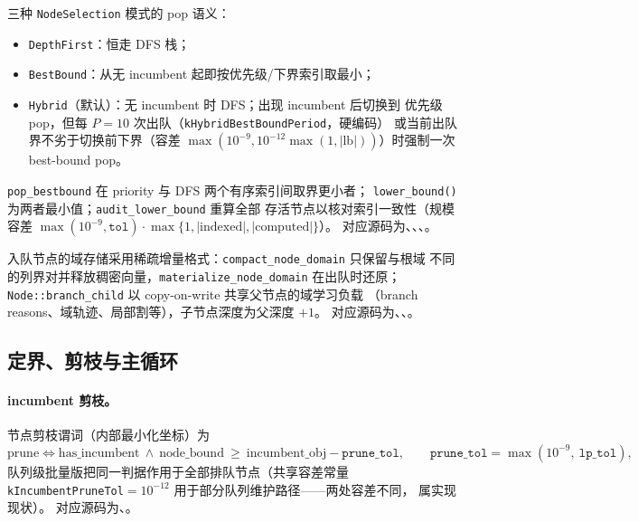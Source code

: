 三种 \texttt{NodeSelection} 模式的 pop 语义：
\begin{itemize}
  \item \texttt{DepthFirst}：恒走 DFS 栈；
  \item \texttt{BestBound}：从无 incumbent 起即按优先级/下界索引取最小；
  \item \texttt{Hybrid}（默认）：无 incumbent 时 DFS；出现 incumbent 后切换到
        优先级 pop，但每 $P=10$ 次出队（\texttt{kHybridBestBoundPeriod}，硬编码）
        或当前出队界不劣于切换前下界（容差
        $\max(10^{-9},10^{-12}\max(1,|\mathrm{lb}|))$）时强制一次 best-bound pop。
\end{itemize}
\texttt{pop\_bestbound} 在 priority 与 DFS 两个有序索引间取界更小者；
\texttt{lower\_bound()} 为两者最小值；\texttt{audit\_lower\_bound} 重算全部
存活节点以核对索引一致性（规模容差 $\max(10^{-9},\texttt{tol})\cdot
\max\{1,|\mathrm{indexed}|,|\mathrm{computed}|\}$）。
对应源码为、、、。

入队节点的域存储采用稀疏增量格式：\texttt{compact\_node\_domain} 只保留与根域
不同的列界对并释放稠密向量，\texttt{materialize\_node\_domain} 在出队时还原；
\texttt{Node::branch\_child} 以 copy-on-write 共享父节点的域学习负载
（branch reasons、域轨迹、局部割等），子节点深度为父深度 $+1$。
对应源码为、、。

\subsection{定界、剪枝与主循环}\label{subsec:milpbc-mainloop}

\paragraph{incumbent 剪枝。}
节点剪枝谓词（内部最小化坐标）为
\begin{equation}
  \mathrm{prune}\iff
  \mathrm{has\_incumbent}\ \land\
  \mathrm{node\_bound}\ \ge\ \mathrm{incumbent\_obj}-\texttt{prune\_tol},
  \qquad \texttt{prune\_tol}=\max(10^{-9},\ \texttt{lp\_tol}),
\end{equation}
队列级批量版把同一判据作用于全部排队节点（共享容差常量
\texttt{kIncumbentPruneTol}$=10^{-12}$ 用于部分队列维护路径——两处容差不同，
属实现现状）。
对应源码为、。

